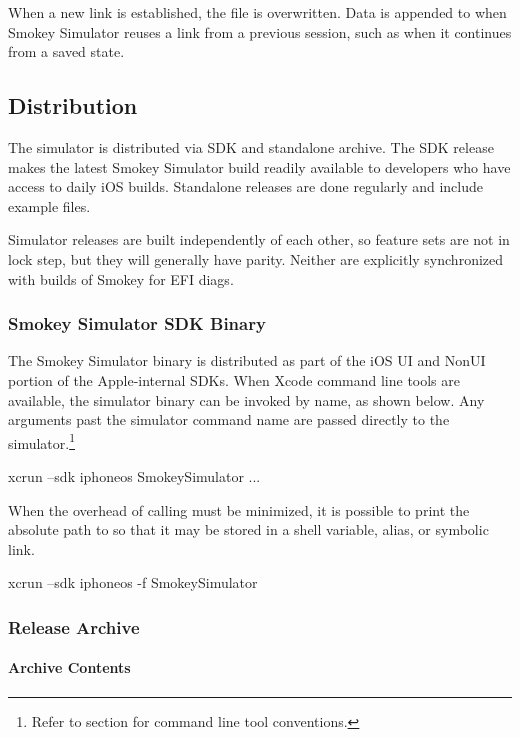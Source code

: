 When a new link is established, the file  is overwritten.  Data
is appended to  when Smokey Simulator reuses a link from a
previous session, such as when it continues from a saved state.

\subsection{Distribution}

The simulator is distributed via SDK and standalone archive.  The SDK release
makes the latest Smokey Simulator build readily available to developers who
have access to daily iOS builds.  Standalone releases are done regularly and
include example files.

Simulator releases are built independently of each other, so feature sets are
not in lock step, but they will generally have parity.  Neither are explicitly
synchronized with builds of Smokey for EFI diags.

\subsubsection{Smokey Simulator SDK Binary}

The Smokey Simulator binary is distributed as part of the iOS UI and NonUI
portion of the Apple-internal SDKs.  When Xcode command line tools are
available, the simulator binary can be invoked by name, as shown below.  Any
arguments past the simulator command name are passed directly to the
simulator.\footnote{Refer to section  for command line
tool conventions.}

\begin{CommandLine}
xcrun --sdk iphoneos SmokeySimulator ...
\end{CommandLine}

When the overhead of calling  must be minimized, it is possible
to print the absolute path to  so that it may be
stored in a shell variable, alias, or symbolic link.

\begin{CommandLine}
xcrun --sdk iphoneos -f SmokeySimulator
\end{CommandLine}

\subsubsection{Release Archive}

\paragraph{Archive Contents}


